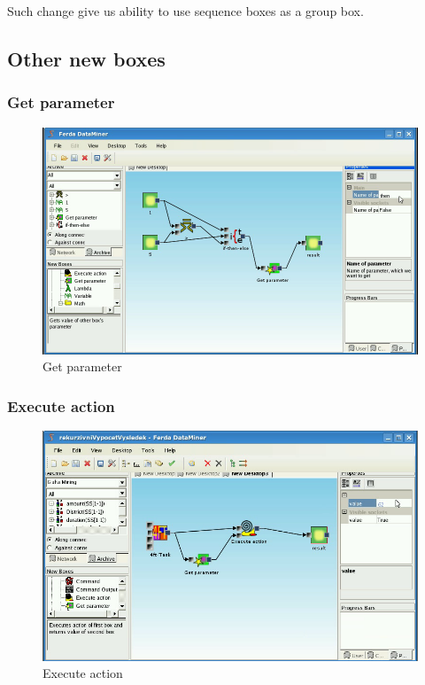 \documentclass[a4paper,12pt]{book}
\begin{document}
Such change give us ability to use sequence boxes as a group box.

\subsection{Other new boxes}
\subsubsection{Get parameter}
\begin{figure}
\includegraphics[width=13.72cm]{getParameter2.png}
	\caption{Get parameter}
\end{figure}

\subsubsection{Execute action}
\begin{figure}
\includegraphics[width=13.72cm]{executeAction2.png}
	\caption{Execute action}
\end{figure}
\end{document}

